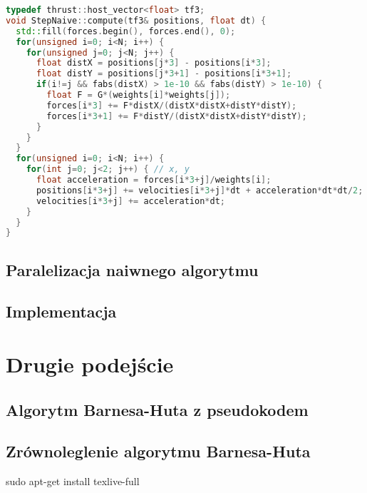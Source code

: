 \documentclass[14pt,twoside,a4paper]{article}
\begin{document}

\begin{lstlisting}[language=C++, frame=single, framerule=2pt, caption=compute next step]
typedef thrust::host_vector<float> tf3;
void StepNaive::compute(tf3& positions, float dt) {
  std::fill(forces.begin(), forces.end(), 0);
  for(unsigned i=0; i<N; i++) {
    for(unsigned j=0; j<N; j++) {
      float distX = positions[j*3] - positions[i*3];
      float distY = positions[j*3+1] - positions[i*3+1];
      if(i!=j && fabs(distX) > 1e-10 && fabs(distY) > 1e-10) {
        float F = G*(weights[i]*weights[j]);
        forces[i*3] += F*distX/(distX*distX+distY*distY);
        forces[i*3+1] += F*distY/(distX*distX+distY*distY);
      }
    }
  }
  for(unsigned i=0; i<N; i++) {
    for(int j=0; j<2; j++) { // x, y
      float acceleration = forces[i*3+j]/weights[i];
      positions[i*3+j] += velocities[i*3+j]*dt + acceleration*dt*dt/2;
      velocities[i*3+j] += acceleration*dt;
    }
  }
}
\end{lstlisting}

\subsection{\Large Paralelizacja naiwnego algorytmu}

\bigskip
\subsection{\Large Implementacja}

\bigskip

\section{\LARGE Drugie podejście}

\bigskip

\subsection{\Large Algorytm Barnesa-Huta z pseudokodem}

\bigskip

\subsection{\Large Zrównoleglenie algorytmu Barnesa-Huta}

\bigskip
 sudo apt-get install texlive-full
\end{document}
